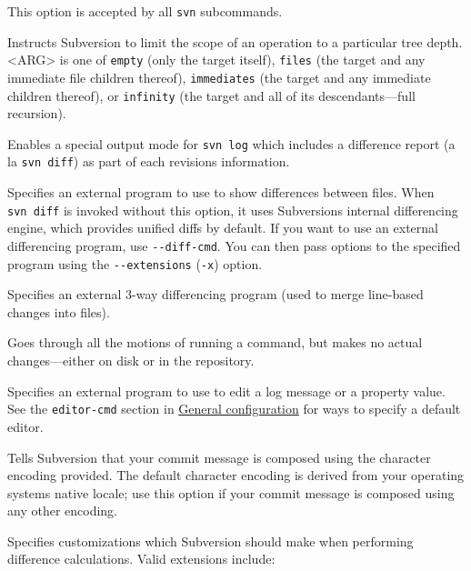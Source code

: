 \begin{description}
This option is accepted by all \texttt{svn} subcommands.
\item[\protect\phantomsection\label{svn.ref.svn.sw.depth}{}\texttt{-\/-depth}
\textless ARG\textgreater{}]
Instructs Subversion to limit the scope of an operation to a particular
tree depth. \textless ARG\textgreater{} is one of \texttt{empty} (only
the target itself), \texttt{files} (the target and any immediate file
children thereof), \texttt{immediates} (the target and any immediate
children thereof), or \texttt{infinity} (the target and all of its
descendants---full recursion).
\item[\protect\phantomsection\label{svn.ref.svn.sw.diff}{}\texttt{-\/-diff}]
Enables a special output mode for \texttt{svn\ log} which includes a
difference report (a la \texttt{svn\ diff}) as part of each
revision\textquotesingle s information.
\item[\protect\phantomsection\label{svn.ref.svn.sw.diff_cmd}{}\texttt{-\/-diff-cmd}
\textless CMD\textgreater{}]
Specifies an external program to use to show differences between files.
When \texttt{svn\ diff} is invoked without this option, it uses
Subversion\textquotesingle s internal differencing engine, which
provides unified diffs by default. If you want to use an external
differencing program, use \texttt{-\/-diff-cmd}. You can then pass
options to the specified program using the \texttt{-\/-extensions}
(\texttt{-x}) option.
\item[\protect\phantomsection\label{svn.ref.svn.sw.diff3_cmd}{}\texttt{-\/-diff3-cmd}
\textless CMD\textgreater{}]
Specifies an external 3-way differencing program (used to merge
line-based changes into files).
\item[\protect\phantomsection\label{svn.ref.svn.sw.dry_run}{}\texttt{-\/-dry-run}]
Goes through all the motions of running a command, but makes no actual
changes---either on disk or in the repository.
\item[\protect\phantomsection\label{svn.ref.svn.sw.editor_cmd}{}\texttt{-\/-editor-cmd}
\textless CMD\textgreater{}]
Specifies an external program to use to edit a log message or a property
value. See the \texttt{editor-cmd} section in
\hyperref[svn.advanced.confarea.opts.config]{General configuration} for
ways to specify a default editor.
\item[\protect\phantomsection\label{svn.ref.svn.sw.encoding}{}\texttt{-\/-encoding}
\textless ENC\textgreater{}]
Tells Subversion that your commit message is composed using the
character encoding provided. The default character encoding is derived
from your operating system\textquotesingle s native locale; use this
option if your commit message is composed using any other encoding.
\item[\protect\phantomsection\label{svn.ref.svn.sw.extensions}{}\texttt{-\/-extensions}
(\texttt{-x}) \textless ARG\textgreater{}]
Specifies customizations which Subversion should make when performing
difference calculations. Valid extensions include:


\end{description}
